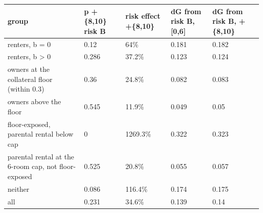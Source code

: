 \begingroup\small
\setlength{\tabcolsep}{3pt}
\renewcommand{\arraystretch}{1.04}
\begin{tabularx}{\linewidth}{XXXXX}
\toprule
group & p +\{8,10\} risk B & risk effect +\{8,10\} & dG from risk B, [0,6] & dG from risk B, +\{8,10\} \\
\midrule
renters, b = 0 & 0.12 & 64\% & 0.181 & 0.182 \\
renters, b \textgreater{} 0 & 0.286 & 37.2\% & 0.123 & 0.124 \\
owners at the collateral floor (within 0.3) & 0.36 & 24.8\% & 0.082 & 0.083 \\
owners above the floor & 0.545 & 11.9\% & 0.049 & 0.05 \\
floor-exposed, parental rental below cap & 0 & 1269.3\% & 0.322 & 0.323 \\
parental rental at the 6-room cap, not floor-exposed & 0.525 & 20.8\% & 0.055 & 0.057 \\
neither & 0.086 & 116.4\% & 0.174 & 0.175 \\
all & 0.231 & 34.6\% & 0.139 & 0.14 \\
\bottomrule
\end{tabularx}
\endgroup
